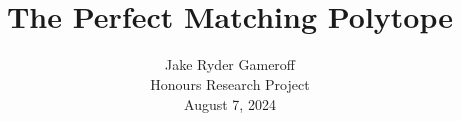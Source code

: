 \documentclass{beamer}
\title{\\ $ $ \\ $ $ \\ The Perfect Matching Polytope}
\author{Jake Ryder Gameroff \\ Honours Research Project \\ August 7, 2024}
\date{}
\begin{document}
\frame{\titlepage}


\end{document}
